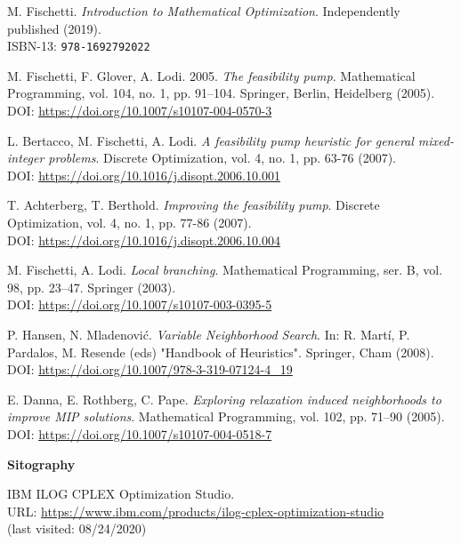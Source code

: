 \documentclass[a4paper,12pt,twoside]{scrbook}
\begin{document}
\begin{thebibliography}{9}
	 M. Fischetti. \textit{Introduction to Mathematical Optimization}. Independently published (2019). \\ ISBN-13: \texttt{978-1692792022}

	 M. Fischetti, F. Glover, A. Lodi. 2005. \textit{The feasibility pump}. Mathematical Programming, vol. 104, no. 1, pp. 91–104. Springer, Berlin, Heidelberg (2005). \\ DOI: \url{https://doi.org/10.1007/s10107-004-0570-3}

	 L. Bertacco, M. Fischetti, A. Lodi. \textit{A feasibility pump heuristic for general mixed-integer problems}. Discrete Optimization, vol. 4, no. 1, pp. 63-76 (2007). \\ DOI: \url{https://doi.org/10.1016/j.disopt.2006.10.001}

	 T. Achterberg, T. Berthold. \textit{Improving the feasibility pump}. Discrete Optimization, vol. 4, no. 1, pp. 77-86 (2007). \\ DOI: \url{https://doi.org/10.1016/j.disopt.2006.10.004}

	 M. Fischetti, A. Lodi. \textit{Local branching}. Mathematical Programming, ser. B, vol. 98, pp. 23–47. Springer (2003). \\ DOI: \url{https://doi.org/10.1007/s10107-003-0395-5}

	 P. Hansen, N. Mladenović. \textit{Variable Neighborhood Search}. In: R. Martí, P. Pardalos, M. Resende (eds) "Handbook of Heuristics". Springer, Cham (2008). \\ DOI: \url{https://doi.org/10.1007/978-3-319-07124-4_19}

	 E. Danna, E. Rothberg, C. Pape. \textit{Exploring relaxation induced neighborhoods to improve MIP solutions}. Mathematical Programming, vol. 102, pp. 71–90 (2005). \\ DOI: \url{https://doi.org/10.1007/s10107-004-0518-7}
	
	\vspace{0.5cm}
	\textsf{\Large \textbf{Sitography}}

	 IBM ILOG CPLEX Optimization Studio. \\ URL: \url{https://www.ibm.com/products/ilog-cplex-optimization-studio} \\ (last visited: 08/24/2020)


\end{thebibliography}
\end{document}
